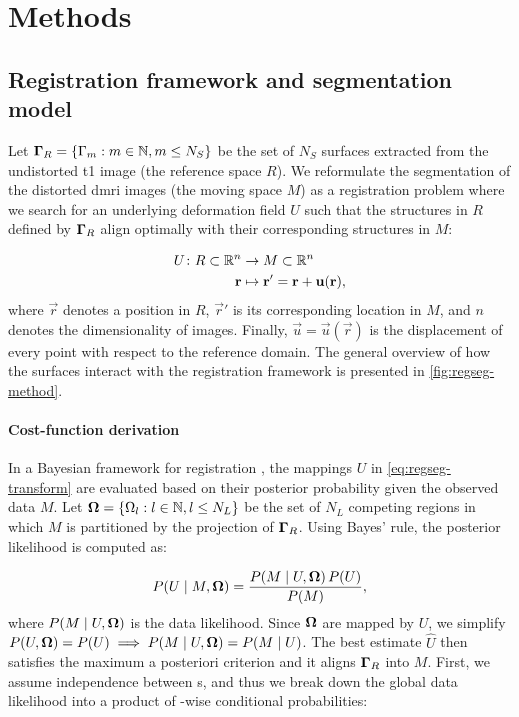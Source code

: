 \section{Methods}\label{sec:regseg-methods}

\subsection{Registration framework and segmentation model}\label{sec:regseg-methods_map}
Let $\boldsymbol{\Gamma}_R = \{\Gamma_m: m \in \mathbb{N}, m \leq N_S\}$ be the set of $N_S$ surfaces
  extracted from the undistorted \gls*{t1} image (the reference space $R$).
We reformulate the segmentation of the distorted \gls*{dmri} images (the moving space $M$)
  as a registration problem where we search for an underlying deformation field $U$ such that
  the structures in $R$ defined by $\boldsymbol{\Gamma}_R$ align optimally with their corresponding
  structures in $M$:

  \begin{align}
  U\colon R \subset \mathbb{R}^n &\to M \subset \mathbb{R}^n \notag\\
  \vec{r} &\mapsto \vec{r}' =\vec{r}+\vec{u}(\vec{r}),
  \label{eq:regseg-transform}
  \end{align}
  where $\vec{r}$ denotes a position in $R$, $\vec{r}'$ is
  its corresponding location in $M$, and $n$ denotes the dimensionality of images.
Finally, $\vec{u} = \vec{u}(\vec{r})$ is the displacement of every point with respect
  to the reference domain.
The general overview of how the surfaces interact with the registration framework
  is presented in \autoref{fig:regseg-method}.

\paragraph*{Cost-function derivation}
In a Bayesian framework for registration \citep{wyatt_map_2003,pohl_bayesian_2006,gass_simultaneous_2014},
  the mappings $U$ in \eqref{eq:regseg-transform} are
  evaluated based on their posterior probability given the observed data
  $M$.
Let $\boldsymbol{\Omega} = \{\Omega_l: l \in \mathbb{N}, l \leq N_L\}$ be the set of $N_L$ competing regions in
  which $M$ is partitioned by the projection of $\boldsymbol{\Gamma}_R$.
Using Bayes' rule, the posterior likelihood is computed as:

  \begin{equation}
  P(U \mid M, \omegaset ) = \frac{P(M \mid U,\omegaset )\, P(U)}{P(M)},
  \label{eq:regseg-bayes_rule}
  \end{equation}
  where $P(M \mid U,\boldsymbol{\Omega})$ is the data likelihood.
Since $\boldsymbol{\Omega}$ are mapped by $U$, we simplify
  $P(U, \boldsymbol{\Omega}) = P(U) \implies P(M \mid U,\boldsymbol{\Omega}) = P(M \mid U)$.
The best estimate $\hat{U}$ then satisfies the maximum a posteriori criterion
  and it aligns $\boldsymbol{\Gamma}_R$ into $M$.
First, we assume independence between s, and thus we break down the
  global data likelihood into a product of -wise conditional probabilities:

